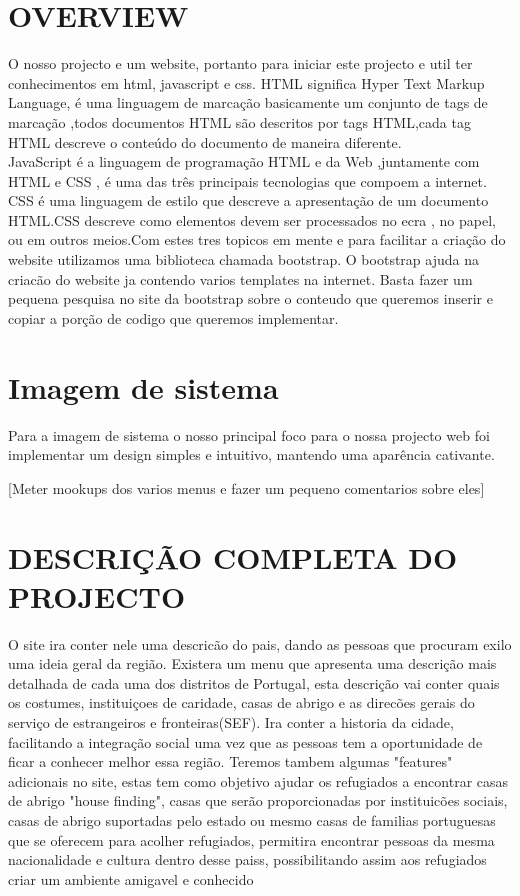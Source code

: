 \documentclass{article}
\begin{document}
\section{OVERVIEW}
O nosso projecto e um website, portanto para iniciar este
projecto e util ter conhecimentos em html, javascript e css.
HTML significa Hyper Text Markup Language, é uma linguagem de marcação basicamente um conjunto de tags de marcação
,todos documentos HTML são descritos por tags HTML,cada tag HTML descreve o conteúdo do documento de maneira diferente.\\
JavaScript é a linguagem de programação HTML e da Web ,juntamente com HTML e CSS , é uma das três principais tecnologias que compoem a internet.
CSS é uma linguagem de estilo que descreve a apresentação de um documento HTML.CSS descreve como elementos devem ser processados no ecra , no papel, ou em outros meios.Com estes tres topicos em mente e para facilitar a criação
do website utilizamos uma biblioteca chamada bootstrap.
O bootstrap ajuda na criacão do website ja contendo varios
templates na internet. Basta fazer um pequena pesquisa no site da bootstrap sobre o conteudo que queremos inserir e copiar a porção de codigo que queremos implementar. 

\section{Imagem de sistema}
Para a imagem de sistema o nosso principal foco para o nossa projecto web foi implementar um design simples e intuitivo, mantendo uma aparência cativante.

[Meter mookups dos varios menus e fazer um pequeno comentarios sobre eles]



\section{DESCRIÇÃO COMPLETA DO PROJECTO}
O site ira conter nele uma descricão do pais, dando as
pessoas que procuram exilo uma ideia geral da região. Existera um menu que apresenta uma descrição mais detalhada
de cada uma dos distritos de Portugal, esta descrição
vai conter quais os costumes, instituiçoes de caridade, casas
de abrigo e as direcões gerais do serviço de estrangeiros e
fronteiras(SEF). Ira conter a historia da cidade, facilitando
a integração social uma vez que as pessoas tem a oportunidade
de ficar a conhecer melhor essa região.
Teremos tambem algumas "features" adicionais no site, estas
tem como objetivo ajudar os refugiados a encontrar casas
de abrigo "house finding", casas que serão proporcionadas
por instituicões sociais, casas de abrigo suportadas pelo estado
ou mesmo casas de familias portuguesas que se oferecem
para acolher refugiados, permitira encontrar pessoas da
mesma nacionalidade e cultura dentro desse paiss, possibilitando
assim aos refugiados criar um ambiente amigavel e
conhecido
\end{document}
